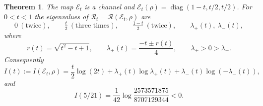 \documentclass[11pt,a4paper]{article}
\newtheorem{theorem}{Theorem}[section]
\theoremstyle{definition}\newtheorem{definition}[theorem]{Definition}
\theoremstyle{remark}\newtheorem{remark}[theorem]{Remark}
\newcommand{\diag}{\operatorname{diag}}
\newcommand{\E}{\mathcal E}
\newcommand{\R}{\mathcal R}
\begin{document}
\begin{theorem}\label{thm:witness}
The map $\E_t$ is a channel and $\E_t(\rho)=\diag(1-t,t/2,t/2)$. For $0<t<1$ the eigenvalues of $\R_t=\R(\E_t,\rho)$ are
\begin{equation}\label{eq:spectrum}
 0\ (\text{twice}),\qquad
 \tfrac t2\ (\text{three times}),\qquad
 \tfrac{1-t}{2}\ (\text{twice}),\qquad
 \lambda_+(t),\ \lambda_-(t),
\end{equation}
where
\begin{equation}\label{eq:lambdas}
 r(t)=\sqrt{t^2-t+1},\qquad
 \lambda_\pm(t)=\frac{-t\pm r(t)}4,\qquad \lambda_+>0>\lambda_-.
\end{equation}
Consequently
\begin{equation}\label{eq:Iformula}
 I(t):=I(\E_t,\rho)=\frac t2\log(2t)
       +\lambda_+(t)\log\lambda_+(t)
       +\lambda_-(t)\log(-\lambda_-(t)),
\end{equation}
and
\begin{equation}\label{eq:integer}
 I(5/21)=\frac1{42}\log\frac{2573571875}{8707129344}<0.
\end{equation}
\end{theorem}
\end{document}
